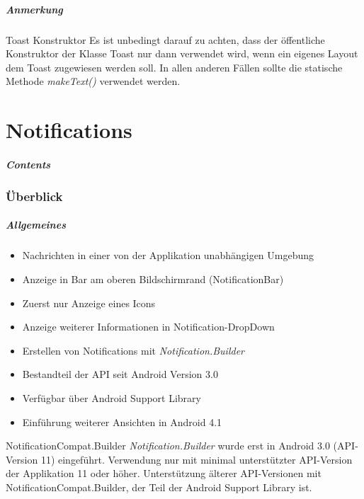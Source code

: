 \begin{frame}
   \frametitle{Anmerkung}
   \begin{alertblock}{Toast Konstruktor}
		Es ist unbedingt darauf zu achten, dass der öffentliche Konstruktor der Klasse 
		Toast nur dann verwendet wird, wenn ein eigenes Layout dem Toast zugewiesen werden 
		soll. In allen anderen Fällen sollte die statische Methode \emph{makeText()} 
		verwendet werden.
   \end{alertblock}
\end{frame}

\part{Notifications}
\frame{\partpage}
\begin{frame}
	\frametitle{Contents}
	\tableofcontents[]
\end{frame}

\section{Überblick}
\begin{frame}
   \frametitle{Allgemeines}
   \begin{itemize}
      \item Nachrichten in einer von der Applikation unabhängigen Umgebung
      \item Anzeige in Bar am oberen Bildschirmrand (NotificationBar) 
      \item Zuerst nur Anzeige eines Icons
      \item Anzeige weiterer Informationen in Notification-DropDown
      \item Erstellen von Notifications mit \emph{Notification.Builder}
      \item Bestandteil der API seit Android Version 3.0
      \item Verfügbar über Android Support Library
      \item Einführung weiterer Ansichten in Android 4.1
   \end{itemize}

   \begin{alertblock}{NotificationCompat.Builder}
      \emph{Notification.Builder} wurde erst in Android 3.0 (API-Version 11) eingeführt. 
      Verwendung nur mit minimal unterstützter API-Version der Applikation 11 oder höher. 
      Unterstützung älterer API-Versionen mit NotificationCompat.Builder, der Teil 
      der Android Support Library ist.
   \end{alertblock}
\end{frame}


